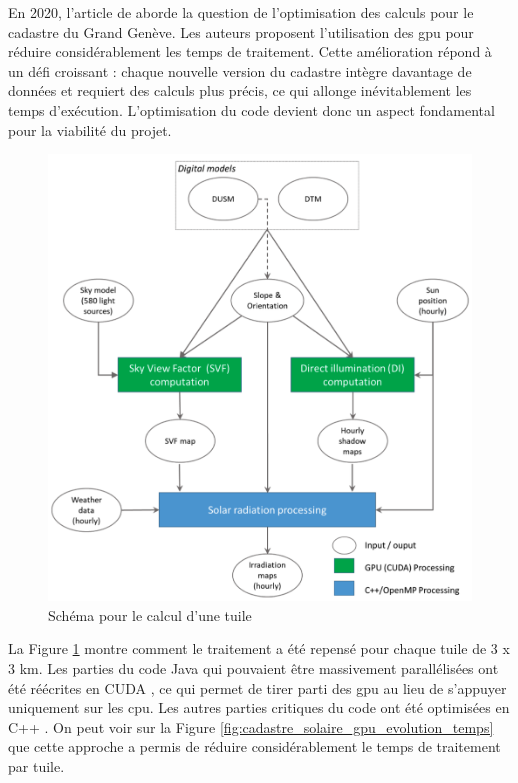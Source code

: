 \par{En 2020, l'article \cite{stendardo_gpu-enabled_2020} de \citeauthor{stendardo_gpu-enabled_2020} aborde la question de l'optimisation des calculs pour le cadastre du Grand Genève. Les auteurs proposent l'utilisation des \acrshort{gpu} pour réduire considérablement les temps de traitement. Cette amélioration répond à un défi croissant : chaque nouvelle version du cadastre intègre davantage de données et requiert des calculs plus précis, ce qui allonge inévitablement les temps d'exécution. L'optimisation du code devient donc un aspect fondamental pour la viabilité du projet.}
\begin{figure}[H]
    \centering
    \includegraphics[width=1\linewidth]{02-main//figures/cadastre_solaire_gpu.png}
    \caption{Schéma pour le calcul d'une tuile \cite{stendardo_gpu-enabled_2020}}
    \label{fig:cadastre_solaire_gpu}
\end{figure}
\par{La Figure \ref{fig:cadastre_solaire_gpu} montre comment le traitement a été repensé pour chaque tuile de 3 x 3 km. Les parties du code Java qui pouvaient être massivement parallélisées ont été réécrites en CUDA \cite{nvidia_cuda_nodate}, ce qui permet de tirer parti des \acrshort{gpu} au lieu de s'appuyer uniquement sur les \acrshort{cpu}. Les autres parties critiques du code ont été optimisées en C++ \cite{noauthor_c_2025}. On peut voir sur la Figure \ref{fig:cadastre_solaire_gpu_evolution_temps} que cette approche a permis de réduire considérablement le temps de traitement par tuile.}

